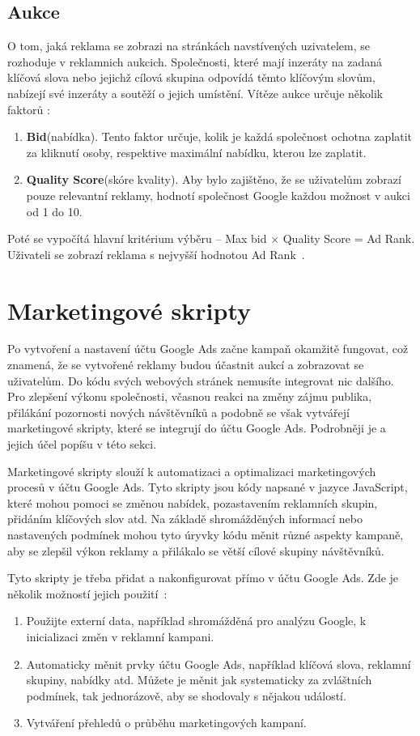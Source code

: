 \subsection*{Aukce}
O tom, jaká reklama se zobrazi na stránkách navstívených uzivatelem, se rozhoduje v reklamnich aukcich. Společnosti, které mají inzeráty na zadaná klíčová slova nebo jejichž cílová skupina odpovídá těmto klíčovým slovům, nabízejí své inzeráty a soutěží o jejich umístění. Vítěze aukce určuje několik faktorů \cite{rtb}:
\begin{enumerate}
  \item \textbf{Bid}(nabídka). Tento faktor určuje, kolik je každá společnost ochotna zaplatit za kliknutí osoby, respektive maximální nabídku, kterou lze zaplatit.
  \item \textbf{Quality Score}(skóre kvality). Aby bylo zajištěno, že se uživatelům zobrazí pouze relevantní reklamy, hodnotí společnost Google každou možnost v aukci od 1 do 10. 
\end{enumerate}
Poté se vypočítá hlavní kritérium výběru -- Max bid $\times$ Quality Score = Ad Rank. Uživateli se zobrazí reklama s nejvyšší hodnotou Ad Rank~\cite{auction}.


\section{Marketingové skripty}
\label{sec:2:marketing}
Po vytvoření a nastavení účtu Google Ads začne kampaň okamžitě fungovat, což znamená, že se vytvořené reklamy budou účastnit aukcí a zobrazovat se uživatelům. Do kódu svých webových stránek nemusíte integrovat nic dalšího. Pro zlepšení výkonu společnosti, včasnou reakci na změny zájmu publika, přilákání pozornosti nových návštěvníků a podobně se však vytvářejí marketingové skripty, které se integrují do účtu Google Ads. Podrobněji je a jejich účel popíšu v této sekci.

Marketingové skripty slouží k automatizaci a optimalizaci marketingových procesů v účtu Google Ads. Tyto skripty jsou kódy napsané v jazyce JavaScript, které mohou pomoci se změnou nabídek, pozastavením reklamních skupin, přidáním klíčových slov atd. Na základě shromážděných informací nebo nastavených podmínek mohou tyto úryvky kódu měnit různé aspekty kampaně, aby se zlepšil výkon reklamy a přilákalo se větší cílové skupiny návštěvníků.

Tyto skripty je třeba přidat a nakonfigurovat přímo v účtu Google Ads. Zde je několik možností jejich použití~\cite{adsHelp}:
\begin{enumerate}
  \item Použijte externí data, například shromážděná pro analýzu Google, k inicializaci změn v reklamní kampani.
  \item Automaticky měnit prvky účtu Google Ads, například klíčová slova, reklamní skupiny, nabídky atd. Můžete je měnit jak systematicky za zvláštních podmínek, tak jednorázově, aby se shodovaly s nějakou událostí.
  \item Vytváření přehledů o průběhu marketingových kampaní.
\end{enumerate}

